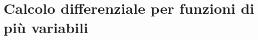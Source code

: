 \documentclass[../appunti-analisi.tex]{subfiles}
\begin{document}
\section{Calcolo differenziale per funzioni di più variabili}


\newpage

\newpage

\newpage

\newpage

\newpage

\end{document}
